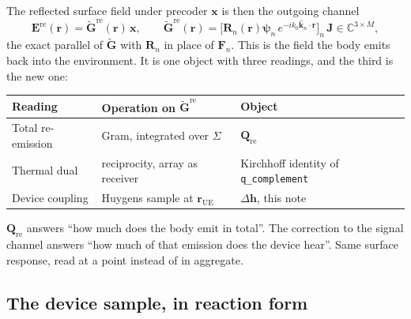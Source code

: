 \documentclass[11pt]{article}
\newcommand{\khat}{\hat{\bm{k}}}
\newcommand{\rr}{\mathbf{r}}
\newcommand{\xx}{\mathbf{x}}
\newcommand{\hh}{\mathbf{h}}
\newcommand{\Gtil}{\tilde{\mathbf{G}}}
\newcommand{\Gre}{\Gtil^{\mathrm{re}}}
\newcommand{\Qref}{\mathbf{Q}_{\mathrm{re}}}
\newcommand{\Jmat}{\mathbf{J}}
\newcommand{\Fn}{\mathbf{F}_n}
\newcommand{\Rn}{\mathbf{R}_n}
\newcommand{\psin}{\bm{\psi}_n}
\newcommand{\Complex}{\mathbb{C}}
\newcommand{\rue}{\rr_{\mathrm{UE}}}
\theoremstyle{remark}
\begin{document}
The reflected surface field under precoder $\xx$ is then the outgoing
channel
\begin{equation}\label{eq:Gre}
  \mathbf{E}^{\mathrm{re}}(\rr) = \Gre(\rr)\,\xx,
  \qquad
  \Gre(\rr) = \bigl[\Rn(\rr)\psin\, e^{-i k_0 \khat_n \cdot \rr}\bigr]_{n}
  \, \Jmat \in \Complex^{3 \times M},
\end{equation}
the exact parallel of $\Gtil$ with $\Rn$ in place of $\Fn$. This is
the field the body emits back into the environment. It is one object
with three readings, and the third is the new one:
\begin{center}
\begin{tabular}{@{}lll@{}}
\toprule
Reading & Operation on $\Gre$ & Object \\
\midrule
Total re-emission & Gram, integrated over $\Sigma$ & $\Qref$ \\
Thermal dual & reciprocity, array as receiver & Kirchhoff identity of \texttt{q\_complement} \\
Device coupling & Huygens sample at $\rue$ & $\Delta\hh$, this note \\
\bottomrule
\end{tabular}
\end{center}
$\Qref$ answers ``how much does the body emit in total''. The
correction to the signal channel answers ``how much of that emission
does the device hear''. Same surface response, read at a point
instead of in aggregate.

\subsection{The device sample, in reaction form}
\end{document}
